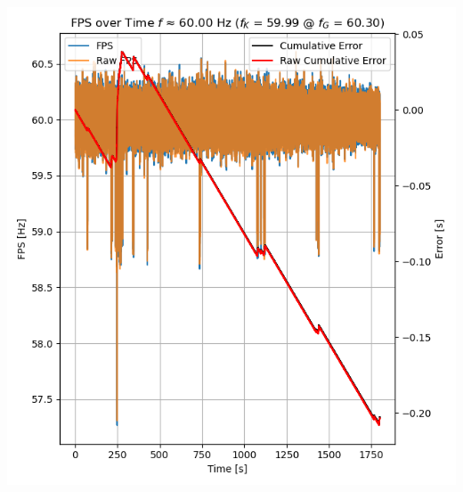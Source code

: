 \noindent\begin{minipage}[t]{\dimexpr.994\linewidth/3}\vspace{0pt}
    \begin{centering}
        \includegraphics[width=\linewidth]{../results/59-99fps-4999us-at-60-299084fps-fps-both}
        \vspace{-2.0em}
        \label{img:fps-ot}
    \end{centering}
\end{minipage}
